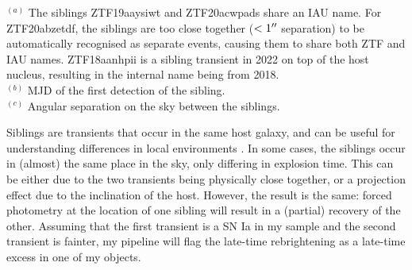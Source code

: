 \documentclass[a4paper,oneside,12pt, class=Latex/Classes/PhDthesisPSnPDF, crop=false]{standalone}
\begin{document}
\begin{table}
 \centering
 \caption[Objects with a detected sibling transient.]{Objects with a detected sibling transient.}
 \begin{flushleft}
$^{(a)}$ The siblings ZTF19aaysiwt and ZTF20acwpads share an IAU name. For ZTF20abzetdf, the siblings are too close together ($<1^{\prime\prime}$ separation) to be automatically recognised as separate events, causing them to share both ZTF and IAU names. ZTF18aanhpii is a sibling transient in 2022 on top of the host nucleus, resulting in the internal name being from 2018. \\
$^{(b)}$ MJD of the first detection of the sibling. \\
$^{(c)}$ Angular separation on the sky between the siblings. \\
\end{flushleft} 
 \label{tab:siblings}
\end{table}

Siblings are transients that occur in the same host galaxy, and can be useful for understanding differences in local environments \citep[e.g.,][]{biswas_siblings, BTS_siblings}. In some cases, the siblings occur in (almost) the same place in the sky, only differing in explosion time. This can be either due to the two transients being physically close together, or a projection effect due to the inclination of the host. However, the result is the same: forced photometry at the location of one sibling will result in a (partial) recovery of the other. Assuming that the first transient is a SN Ia in my sample and the second transient is fainter, my pipeline will flag the late-time rebrightening as a late-time excess in one of my objects.
\end{document}
